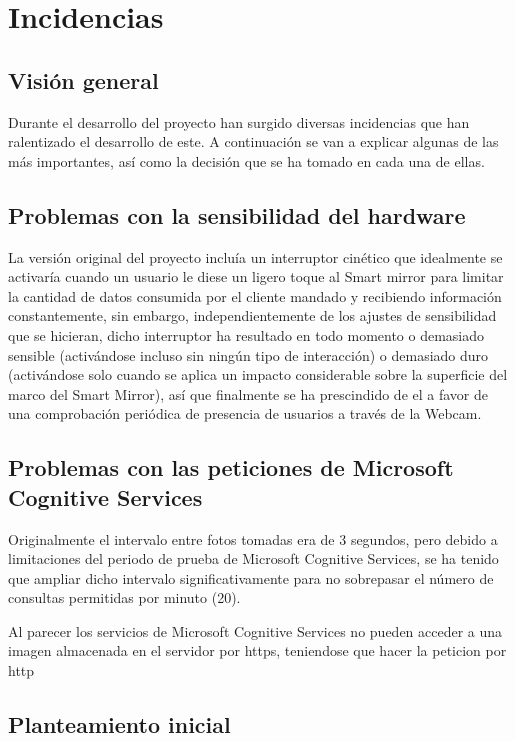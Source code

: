 \chapter{Incidencias}

\section{Visión general}

Durante el desarrollo del proyecto han surgido diversas incidencias que han ralentizado el desarrollo de este. A continuación se van a explicar algunas de las más importantes, así como la decisión que se ha tomado en cada una de ellas.

\section{Problemas con la sensibilidad del hardware}

La versión original del proyecto incluía un interruptor cinético que idealmente se activaría cuando un usuario le diese un ligero toque al Smart mirror para limitar la cantidad de datos consumida por el cliente mandado y recibiendo información constantemente, sin embargo, independientemente de los ajustes de sensibilidad que se hicieran, dicho interruptor ha resultado en todo momento o demasiado sensible (activándose incluso sin ningún tipo de interacción) o demasiado duro (activándose solo cuando se aplica un impacto considerable sobre la superficie del marco del Smart Mirror), así que finalmente se ha prescindido de el a favor de una comprobación periódica de presencia de usuarios a través de la Webcam.

\section{Problemas con las peticiones de Microsoft Cognitive Services}

Originalmente el intervalo entre fotos tomadas era de 3 segundos, pero debido a limitaciones del periodo de prueba de Microsoft Cognitive Services, se ha tenido que ampliar dicho intervalo significativamente para no sobrepasar el número de consultas permitidas por minuto (20).

Al parecer los servicios de Microsoft Cognitive Services no pueden acceder a una imagen almacenada en el servidor por \acrshort{https}, teniendose que hacer la peticion por \acrshort{http}

\section{Planteamiento inicial}

